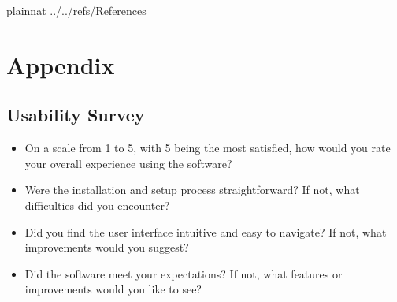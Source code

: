 \documentclass[12pt, titlepage]{article}
\begin{document}
   {plainnat}
   {../../refs/References}

\newpage
\section{Appendix}


\subsection{Usability Survey}\label{US}
\begin{itemize}
\item On a scale from 1 to 5, with 5 being the most satisfied, how would you rate your overall experience using the software?
\item Were the installation and setup process straightforward? If not, what difficulties did you encounter?
\item Did you find the user interface intuitive and easy to navigate? If not, what improvements would you suggest?
\item Did the software meet your expectations? If not, what features or improvements would you like to see?
\end{itemize}
\end{document}
